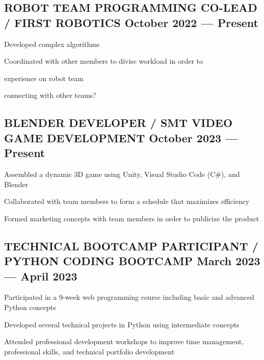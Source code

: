 \subsection{{ROBOT TEAM PROGRAMMING CO-LEAD / FIRST ROBOTICS \hfill October 2022 --- Present}}
\begin{zitemize}
\item Developed complex algorithms %
\item Coordinated with other members to divise workload in order to 
\item experience on robot team
\item connecting with other teams?
\end{zitemize}

\subsection{{BLENDER DEVELOPER / SMT VIDEO GAME DEVELOPMENT \hfill October 2023 --- Present}}
\begin{zitemize}
\item Assembled a dynamic 3D game using Unity, Visual Studio Code (C\#), and Blender
\item Collaborated with team members to form a schedule that maximizes efficiency
\item Formed marketing concepts with team members in order to publicize the product
\end{zitemize}

\subsection{{TECHNICAL BOOTCAMP PARTICIPANT / PYTHON CODING BOOTCAMP \hfill March 2023 --- April 2023}}
\begin{zitemize}
\item Participated in a 9-week web programming course including basic and advanced Python concepts
\item Developed several technical projects in Python using intermediate concepts
\item Attended professional development workshops to improve time management, professional skills, and technical portfolio development 
\end{zitemize}

